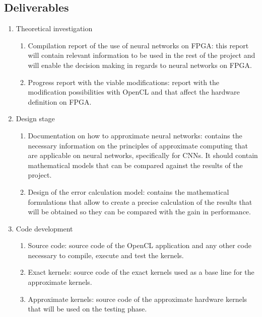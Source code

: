 \subsection{Deliverables}

\begin{enumerate}
    \item Theoretical investigation
        \begin{enumerate}
            \item Compilation report of the use of neural networks on FPGA: this report will contain
            relevant information to be used in the rest of the project and will enable the decision
            making in regards to neural networks on FPGA. 
            \item Progress report with the viable modifications: report with the modification possibilities
            with OpenCL and that affect the hardware definition on FPGA.
        \end{enumerate}
    \item Design stage
        \begin{enumerate}
            \item Documentation on how to approximate neural networks: contains the necessary information
            on the principles of approximate computing that are applicable on neural networks, specifically
            for CNNs. It should contain mathematical models that can be compared against the results
            of the project.
            \item Design of the error calculation model: contains the mathematical formulations that allow
            to create a precise calculation of the results that will be obtained so they can be compared
            with the gain in performance.
        \end{enumerate}
    \item Code development
        \begin{enumerate}
            \item Source code: source code of the OpenCL application and any other code necessary to
            compile, execute and test the kernels.
            \item Exact kernels: source code of the exact kernels used as a base line for the approximate kernels.
            \item Approximate kernels: source code of the approximate hardware kernels that will be used
            on the testing phase.
        \end{enumerate}

\end{enumerate}
